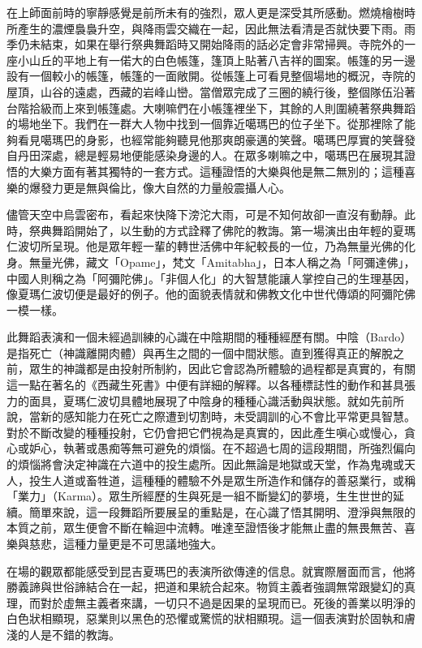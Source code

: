 在上師面前時的寧靜感覺是前所未有的強烈，眾人更是深受其所感動。燃燒檜樹時所產生的濃煙裊裊升空，與降雨雲交織在一起，因此無法看清是否就快要下雨。雨季仍未結束，如果在舉行祭典舞蹈時又開始降雨的話必定會非常掃興。寺院外的一座小山丘的平地上有一偌大的白色帳篷，篷頂上貼著八吉祥的圖案。帳篷的另一邊設有一個較小的帳篷，帳篷的一面敞開。從帳篷上可看見整個場地的概況，寺院的屋頂，山谷的遠處，西藏的岩峰山巒。當僧眾完成了三圈的繞行後，整個隊伍沿著台階拾級而上來到帳篷處。大喇嘛們在小帳篷裡坐下，其餘的人則圍繞著祭典舞蹈的場地坐下。我們在一群大人物中找到一個靠近噶瑪巴的位子坐下。從那裡除了能夠看見噶瑪巴的身影，也經常能夠聽見他那爽朗豪邁的笑聲。噶瑪巴厚實的笑聲發自丹田深處，總是輕易地便能感染身邊的人。在眾多喇嘛之中，噶瑪巴在展現其證悟的大樂方面有著其獨特的一套方式。這種證悟的大樂與他是無二無別的；這種喜樂的爆發力更是無與倫比，像大自然的力量般震攝人心。

儘管天空中烏雲密布，看起來快降下滂沱大雨，可是不知何故卻一直沒有動靜。此時，祭典舞蹈開始了，以生動的方式詮釋了佛陀的教誨。第一場演出由年輕的夏瑪仁波切所呈現。他是眾年輕一輩的轉世活佛中年紀較長的一位，乃為無量光佛的化身。無量光佛，藏文「Opame」，梵文「Amitabha」，日本人稱之為「阿彌達佛」，中國人則稱之為「阿彌陀佛」。「非個人化」的大智慧能讓人掌控自己的生理基因，像夏瑪仁波切便是最好的例子。他的面貌表情就和佛教文化中世代傳頌的阿彌陀佛一模一樣。

此舞蹈表演和一個未經過訓練的心識在中陰期間的種種經歷有關。中陰（Bardo）是指死亡（神識離開肉體）與再生之間的一個中間狀態。直到獲得真正的解脫之前，眾生的神識都是由投射所制約，因此它會認為所體驗的過程都是真實的，有關這一點在著名的《西藏生死書》中便有詳細的解釋。以各種標誌性的動作和甚具張力的面具，夏瑪仁波切具體地展現了中陰身的種種心識活動與狀態。就如先前所說，當新的感知能力在死亡之際遭到切割時，未受調訓的心不會比平常更具智慧。對於不斷改變的種種投射，它仍會把它們視為是真實的，因此產生嗔心或慢心，貪心或妒心，執著或愚痴等無可避免的煩惱。在不超過七周的這段期間，所強烈偏向的煩惱將會決定神識在六道中的投生處所。因此無論是地獄或天堂，作為鬼魂或天人，投生人道或畜牲道，這種種的體驗不外是眾生所造作和儲存的善惡業行，或稱「業力」（Karma）。眾生所經歷的生與死是一組不斷變幻的夢境，生生世世的延續。簡單來說，這一段舞蹈所要展呈的重點是，在心識了悟其開明、澄淨與無限的本質之前，眾生便會不斷在輪迴中流轉。唯達至證悟後才能無止盡的無畏無苦、喜樂與慈悲，這種力量更是不可思議地強大。

在場的觀眾都能感受到昆吉夏瑪巴的表演所欲傳達的信息。就實際層面而言，他將勝義諦與世俗諦結合在一起，把道和果統合起來。物質主義者強調無常跟變幻的真理，而對於虛無主義者來講，一切只不過是因果的呈現而已。死後的善業以明淨的白色狀相顯現，惡業則以黑色的恐懼或驚慌的狀相顯現。這一個表演對於固執和膚淺的人是不錯的教誨。

